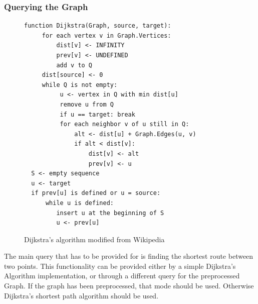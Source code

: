 \documentclass[11pt,twoside,a4paper]{report}
\begin{document}
\subsubsection{Querying the Graph}
\begin{figure}[t]
    \begin{center}
\begin{lstlisting}
function Dijkstra(Graph, source, target):
     for each vertex v in Graph.Vertices:            
         dist[v] <- INFINITY                 
         prev[v] <- UNDEFINED                
         add v to Q                     
     dist[source] <- 0                           
     while Q is not empty:
          u <- vertex in Q with min dist[u]   
          remove u from Q
          if u == target: break                                        
          for each neighbor v of u still in Q:
              alt <- dist[u] + Graph.Edges(u, v)
              if alt < dist[v]:              
                  dist[v] <- alt
                  prev[v] <- u
  S <- empty sequence
  u <- target
  if prev[u] is defined or u = source:
      while u is defined:
         insert u at the beginning of S
         u <- prev[u]
\end{lstlisting}
\end{center}
\caption{Dijkstra's algorithm modified from Wikipedia\cite{dijkstrapseudo}}
\label{dijkstrapseudo}
\end{figure}
The main query that has to be provided for is finding the shortest route between two points. This functionality can be provided either by a simple Dijkstra's Algorithm implementation, or through a different query for the preprocessed Graph. If the graph has been preprocessed,
that mode should be used. Otherwise Dijkstra's shortest path algorithm should be used. 
\end{document}
